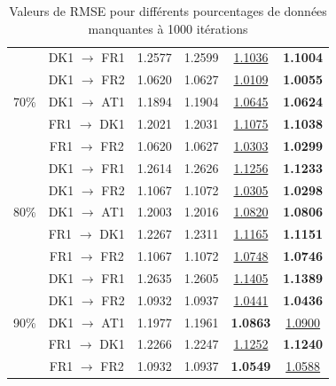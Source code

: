 \documentclass[acmsmall, natbib=false, nonacm]{acmart}
\begin{document}
\begin{table}[H]
\begin{tabular}{| c | c | c | c | c | c |}
        \hline 
        \multirow{5}{4em}{70\%} & DK1 $\rightarrow$ FR1 & 1.2577 & 1.2599 & \underline{1.1036} & \textbf{1.1004} \\
                                & DK1 $\rightarrow$ FR2 & 1.0620 & 1.0627 & \underline{1.0109} & \textbf{1.0055} \\
                                & DK1 $\rightarrow$ AT1 & 1.1894 & 1.1904 & \underline{1.0645} & \textbf{1.0624} \\
                                & FR1 $\rightarrow$ DK1 & 1.2021 & 1.2031 & \underline{1.1075} & \textbf{1.1038} \\
                                & FR1 $\rightarrow$ FR2 & 1.0620 & 1.0627 & \underline{1.0303} & \textbf{1.0299} \\
        \hline 
        \multirow{5}{4em}{80\%} & DK1 $\rightarrow$ FR1 & 1.2614 & 1.2626 & \underline{1.1256} & \textbf{1.1233} \\
                                & DK1 $\rightarrow$ FR2 & 1.1067 & 1.1072 & \underline{1.0305} & \textbf{1.0298} \\
                                & DK1 $\rightarrow$ AT1 & 1.2003 & 1.2016 & \underline{1.0820} & \textbf{1.0806} \\
                                & FR1 $\rightarrow$ DK1 & 1.2267 & 1.2311 & \underline{1.1165} & \textbf{1.1151} \\
                                & FR1 $\rightarrow$ FR2 & 1.1067 & 1.1072 & \underline{1.0748} & \textbf{1.0746} \\
        \hline
        \multirow{5}{4em}{90\%} & DK1 $\rightarrow$ FR1 & 1.2635 & 1.2605 & \underline{1.1405} & \textbf{1.1389} \\
                                & DK1 $\rightarrow$ FR2 & 1.0932 & 1.0937 & \underline{1.0441} & \textbf{1.0436} \\
                                & DK1 $\rightarrow$ AT1 & 1.1977 & 1.1961 & \textbf{1.0863} & \underline{1.0900} \\
                                & FR1 $\rightarrow$ DK1 & 1.2266 & 1.2247 & \underline{1.1252} & \textbf{1.1240} \\
                                & FR1 $\rightarrow$ FR2 & 1.0932 & 1.0937 & \textbf{1.0549} & \underline{1.0588} \\
        \hline 
    \end{tabular}
    \caption{Valeurs de RMSE pour différents pourcentages de données manquantes à 1000 itérations}    
    \end{table}
\end{document}
